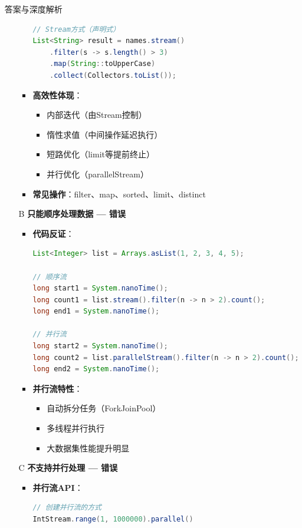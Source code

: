 \documentclass[12pt, a4paper]{ctexart}
\begin{document}
\begin{enumerate}[label=\textbf{\arabic*.}]
\begin{bluebox}{答案与深度解析}
\begin{itemize}[leftmargin=*, nosep, label={}]
\begin{itemize}[label={}, leftmargin=*, nosep]
\begin{lstlisting}[language=Java]
// Stream方式（声明式）
List<String> result = names.stream()
    .filter(s -> s.length() > 3)
    .map(String::toUpperCase)
    .collect(Collectors.toList());
				      \end{lstlisting}
				            \item \textbf{高效性体现}：
				                  \begin{itemize}[label={}, nosep]
					                  \item 内部迭代（由Stream控制）
					                  \item 惰性求值（中间操作延迟执行）
					                  \item 短路优化（limit等提前终止）
					                  \item 并行优化（parallelStream）
				                  \end{itemize}
				            \item \textbf{常见操作}：filter、map、sorted、limit、distinct
			            \end{itemize}

			      \item[B] \textbf{只能顺序处理数据 — 错误}
			            \begin{itemize}[label={}, leftmargin=*, nosep]
				            \item \textbf{代码反证}：
				                  \begin{lstlisting}[language=Java]
List<Integer> list = Arrays.asList(1, 2, 3, 4, 5);

// 顺序流
long start1 = System.nanoTime();
long count1 = list.stream().filter(n -> n > 2).count();
long end1 = System.nanoTime();

// 并行流
long start2 = System.nanoTime();
long count2 = list.parallelStream().filter(n -> n > 2).count();
long end2 = System.nanoTime();
				      \end{lstlisting}
				            \item \textbf{并行流特性}：
				                  \begin{itemize}[label={}, nosep]
					                  \item 自动拆分任务（ForkJoinPool）
					                  \item 多线程并行执行
					                  \item 大数据集性能提升明显
				                  \end{itemize}
			            \end{itemize}

			      \item[C] \textbf{不支持并行处理 — 错误}
			            \begin{itemize}[label={}, leftmargin=*, nosep]
				            \item \textbf{并行流API}：
				                  \begin{lstlisting}[language=Java]
// 创建并行流的方式
IntStream.range(1, 1000000).parallel()


\end{lstlisting}
\end{itemize}
\end{itemize}
\end{bluebox}
\end{enumerate}
\end{document}
